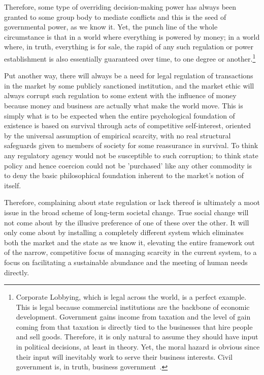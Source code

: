\documentclass[10pt, a4paper, cleardoubleempty, openright, twoside]{book}
\begin{document}
Therefore, some type of overriding decision-making power has always been
granted to some group body to mediate conflicts and this is the seed of
governmental power, as we know it. Yet, the punch line of the whole
circumstance is that in a world where everything is powered by money; in
a world where, in truth, everything is for sale, the rapid
 of any such regulation or power establishment is
also essentially guaranteed over time, to one degree or
another.\footnote{
	Corporate Lobbying, which is legal across the world, is a perfect
	example. This is legal because commercial institutions are the
	backbone of economic development. Government gains income from
	taxation and the level of gain coming from that taxation is directly
	tied to the businesses that hire people and sell goods. Therefore, it
	is only natural to assume they should have input in political
	decisions, at least in theory. Yet, the moral hazard is obvious since
	their input will inevitably work to serve their business interests.
	Civil government is, in truth, business
	government~\cite{Opensecrets:http:14}.
}

Put another way, there will always be a need for legal regulation of
transactions in the market by some publicly sanctioned institution, and
the market ethic will always corrupt such regulation to some extent with
the influence of money because money and business are actually what make
the world move. This is simply what is to be expected when the entire
psychological foundation of existence is based on survival through acts
of competitive self-interest, oriented by the universal assumption of
empirical scarcity, with no real structural safeguards given to members
of society for some reassurance in survival. To think any regulatory
agency would not be susceptible to such corruption; to think state
policy and hence coercion could not be 'purchased' like any other
commodity is to deny the basic philosophical foundation inherent to the
market's notion of  itself.

Therefore, complaining about state regulation or lack thereof is
ultimately a moot issue in the broad scheme of long-term societal
change. True social change will not come about by the illusive
preference of one of these over the other. It will only come about by
installing a completely different system which eliminates both the
market and the state as we know it, elevating the entire framework out
of the narrow, competitive focus of managing scarcity in the current
 system, to a focus on facilitating a
sustainable abundance and the meeting of human needs directly.
\end{document}
